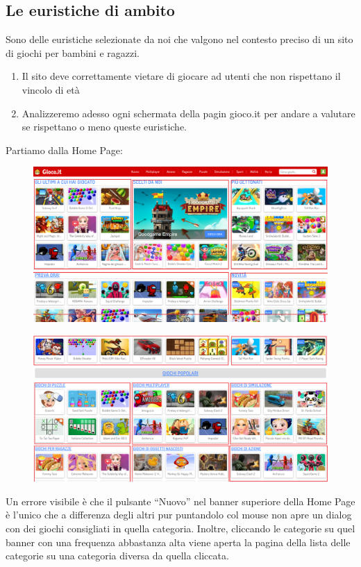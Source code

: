 \documentclass[../Report.tex]{subfiles}
\begin{document}
    \subsection{Le euristiche di ambito}
    Sono delle euristiche selezionate da noi che valgono nel contesto preciso di un sito di giochi per bambini e ragazzi.
    \begin{enumerate}
        \item Il sito deve correttamente vietare di giocare ad utenti che non rispettano il vincolo di età
        \item Analizzeremo adesso ogni schermata della pagin gioco.it per andare a valutare se rispettano o meno queste euristiche.
    \end{enumerate}

    Partiamo dalla Home Page:
    \begin{figure}[H]
        \includegraphics[width=\linewidth]{Assestment1.png}
        \centering
    \end{figure}
    \begin{figure}[H]
        \includegraphics[width=\linewidth]{Assestment2.png}
        \centering
    \end{figure}

    Un errore visibile è che il pulsante “Nuovo” nel banner superiore della Home Page è l’unico che a differenza degli altri pur puntandolo col mouse non apre un dialog con dei giochi consigliati in quella categoria. Inoltre, cliccando le categorie su quel banner con una frequenza abbastanza alta viene aperta la pagina della lista delle categorie su una categoria diversa da quella cliccata.
\end{document}
